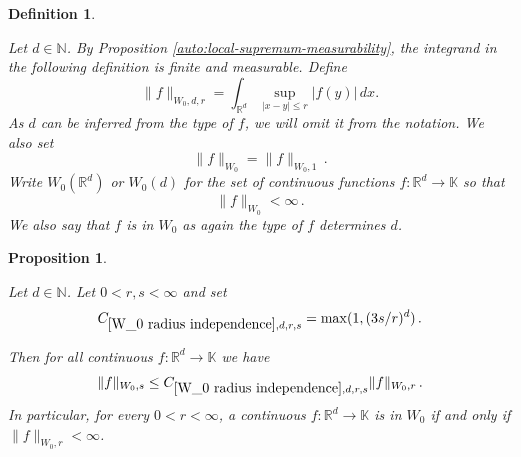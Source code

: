 \documentclass[12pt,reqno]{amsart}
\theoremstyle{plain}
\newtheorem{proposition}[theorem]{Proposition}
\newtheorem{definition}[theorem]{Definition}
\numberwithin{equation}{section}
\theoremstyle{remark}
\newcommand{\uses}[1]{}
\newcommand{\usesdefs}[1]{}
\newcommand{\leanok}{}
\newcommand{\lean}[1]{}
\newcommand{\R}{{\mathbb R}}
\newcommand{\N}{{\mathbb N}}
\begin{document}
\begin{definition}\label{auto:Wiener-space-definition}\uses{auto:local-supremum-measurability}\usesdefs{}
\lean{Auto.wienerEnvelope,Auto.MemW0,Auto.wienerNorm,Auto.wienerNormOne}
Let $d\in \N$.  By Proposition \ref{auto:local-supremum-measurability}, the integrand in the following definition is finite and measurable. Define
\begin{equation}\label{auto:Wiener-local-norm}
\|f\|_{W_0,d,r}=    \int_{\R^d} \sup_{|x-y|\le r} |f(y)|\,dx.
\end{equation}
As $d$ can be inferred from the type of $f$, we
will omit it from the notation.
We also set
\begin{equation}\label{auto:Wiener-norm}
    \|f\|_{W_0}=\|f\|_{W_0,1}\, .
\end{equation}
Write $W_0(\R^d)$ or $W_0(d)$ for the set of continuous functions $f:\R^d\to\mathbb{K}$ so that
\begin{equation}\label{auto:Wiener-space-finiteness}  \|f\|_{W_0}< \infty\, . \end{equation}
We also say that $f$ is in $W_0$ as again the type of $f$
determines $d$.
\end{definition}


\begin{proposition}\label{W_0 radius independence}\uses{auto:local-supremum-measurability}\usesdefs{closed ball,auto:Wiener-space-definition}
\lean{Auto.wienerNorm_le_max_one_three_mul_div_pow_mul,Auto.memW0_iff_integrable_wienerEnvelope}
\leanok
Let $d\in \N$.
Let $0<r,s<\infty$ and set
\begin{equation}\label{auto:Wiener-radius-comparison-constant}
    C_{\ref{W_0 radius independence},d,r,s}=\max(1,(3s/r)^d)\, .
\end{equation}

Then for all continuous
$f:\R^d\to \mathbb{K}$ we have
\begin{equation}\label{W_0(r) property}
    \|f\|_{W_0,s}\le C_{\ref{W_0 radius independence},d,r,s}\|f\|_{W_0,r}\, .
\end{equation}
In particular, for every $0<r<\infty$, a  continuous
$f:\R^d\to \mathbb{K}$ is in $W_0$ if and only if $\|f\|_{W_0,r}<\infty$.
\end{proposition}
\end{document}
